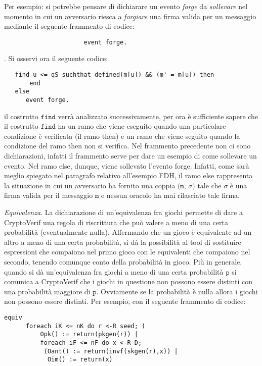\documentclass[a4paper,openright,twoside,12pt]{report}
\begin{document}
\begin{description}
		Per esempio: si potrebbe
		pensare di dichiarare un evento \emph{forge} da \emph{sollevare} nel momento in cui un avversario riesca a \emph{forgiare} una firma
		valida per un messaggio mediante il seguente frammento di codice:
				      \begin{verbatim}
				      event forge.
				      \end{verbatim} .
	      Si osservi ora il seguente codice: 
 				      \begin{verbatim}
   find u <= qS suchthat defined(m[u]) && (m' = m[u]) then 
       end
   else      
      event forge.
				      \end{verbatim}
il costrutto $\texttt{find}$ verr\`a analizzato successivamente, per ora \`e sufficiente sapere che il costrutto $\texttt{find}$ ha un ramo che viene eseguito quando una particolare condizione \`e verificata (il ramo then) e un ramo che
viene seguito quando la condizione del ramo then non si verifica. Nel frammento precedente non ci sono dichiarazioni, infatti il frammento serve per dare un esempio di come
sollevare un evento. Nel ramo else, dunque, viene sollevato l'evento forge. Infatti, come sar\`a meglio spiegato nel paragrafo relativo all'esempio FDH, il ramo else rappresenta la situazione in cui un avversario ha fornito
una coppia $\texttt{(m,} $ $\sigma \texttt{)}$ tale che $\sigma$ \`e una firma valida per il messaggio $\texttt{m}$ e nessun oracolo ha mai rilasciato tale firma.
 \item{\emph{Equivalenza}.} La dichiarazione di un'equivalenza fra giochi permette di dare a CryptoVerif una regola di riscrittura che pu\`o valere
		    a meno di una certa probabilit\`a (eventualmente nulla). Affermando che un gioco \`e equivalente ad un altro a meno di una certa probabilit\`a, 
		    si d\`a la possibilit\`a al tool di sostituire espressioni che compaiono nel primo gioco con le equivalenti che compaiono nel secondo, 
tenendo comunque conto della probabilit\`a in gioco. Pi\`u in generale, quando si d\`a un'equivalenza fra giochi a meno di una certa probabilit\`a $\texttt{p}$ si comunica a CryptoVerif
che i giochi in questione non possono essere distinti con una probabilit\`a maggiore di $\texttt{p}$. Ovviamente se la probabilit\`a \`e nulla allora i giochi non possono essere distinti.
Per esempio, con il seguente frammento di codice:
\begin{verbatim}
equiv 
      foreach iK <= nK do r <-R seed; (
          Opk() := return(pkgen(r)) |
          foreach iF <= nF do x <-R D;
           (Oant() := return(invf(skgen(r),x)) |
            Oim() := return(x)

\end{verbatim}
\end{description}
\end{document}
